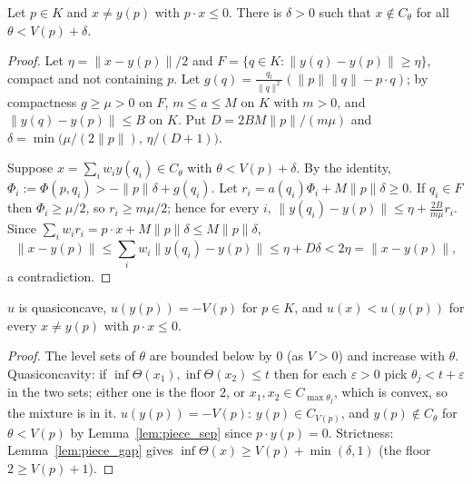 \begin{lemma}
\label{lem:piece_gap}
\leanok
{}
Let $p \in K$ and $x \ne y(p)$ with $p \cdot x \le 0$. There is $\delta > 0$ such that $x \notin C_\theta$ for all
$\theta < V(p) + \delta$.
\end{lemma}
\begin{proof}
\leanok
Let $\eta = \|x - y(p)\|/2$ and $F = \{q \in K : \|y(q) - y(p)\| \ge \eta\}$, compact and not containing $p$. Let
$g(q) = \frac{q_l}{\|q\|^2}(\|p\|\|q\| - p\cdot q)$; by compactness $g \ge \mu > 0$ on $F$, $m \le a \le M$ on $K$ with $m > 0$,
and $\|y(q) - y(p)\| \le B$ on $K$. Put $D = 2BM\|p\|/(m\mu)$ and $\delta = \min\bigl(\mu/(2\|p\|),\, \eta/(D+1)\bigr)$.

Suppose $x = \sum_i w_i y(q_i) \in C_\theta$ with $\theta < V(p) + \delta$. By the identity, $\Phi_i := \Phi(p,q_i) > -\|p\|\delta + g(q_i)$.
Let $r_i = a(q_i)\Phi_i + M\|p\|\delta \ge 0$. If $q_i \in F$ then $\Phi_i \ge \mu/2$, so $r_i \ge m\mu/2$; hence for every $i$,
$\|y(q_i) - y(p)\| \le \eta + \frac{2B}{m\mu} r_i$. Since $\sum_i w_i r_i = p \cdot x + M\|p\|\delta \le M\|p\|\delta$,
\[
  \|x - y(p)\| \le \sum_i w_i \|y(q_i) - y(p)\| \le \eta + D\delta < 2\eta = \|x - y(p)\|,
\]
a contradiction.
\end{proof}

\begin{theorem}
\label{thm:piece_utility}
\leanok
{}
$u$ is quasiconcave, $u(y(p)) = -V(p)$ for $p \in K$, and $u(x) < u(y(p))$ for every $x \ne y(p)$ with $p\cdot x \le 0$.
\end{theorem}
\begin{proof}
\leanok
The level sets of $\theta$ are bounded below by $0$ (as $V > 0$) and increase with $\theta$. Quasiconcavity: if
$\inf\Theta(x_1), \inf\Theta(x_2) \le t$ then for each $\varepsilon > 0$ pick $\theta_j < t + \varepsilon$ in the two sets; either one is
the floor $2$, or $x_1, x_2 \in C_{\max\theta_j}$, which is convex, so the mixture is in it. $u(y(p)) = -V(p)$: $y(p) \in C_{V(p)}$,
and $y(p) \notin C_\theta$ for $\theta < V(p)$ by Lemma~\ref{lem:piece_sep} since $p \cdot y(p) = 0$. Strictness:
Lemma~\ref{lem:piece_gap} gives $\inf\Theta(x) \ge V(p) + \min(\delta, 1)$ (the floor $2 \ge V(p) + 1$).
\end{proof}

